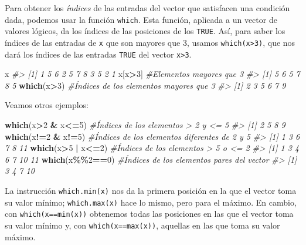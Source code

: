 \documentclass[
]{book}
\newenvironment{Shaded}{\begin{snugshade}}{\end{snugshade}}
\newcommand{\CommentTok}[1]{\textcolor[rgb]{0.56,0.35,0.01}{\textit{#1}}}
\newcommand{\DecValTok}[1]{\textcolor[rgb]{0.00,0.00,0.81}{#1}}
\newcommand{\KeywordTok}[1]{\textcolor[rgb]{0.13,0.29,0.53}{\textbf{#1}}}
\newcommand{\NormalTok}[1]{#1}
\newcommand{\OperatorTok}[1]{\textcolor[rgb]{0.81,0.36,0.00}{\textbf{#1}}}
\newcommand{\StringTok}[1]{\textcolor[rgb]{0.31,0.60,0.02}{#1}}
\theoremstyle{definition}
\theoremstyle{definition}
\theoremstyle{definition}
\theoremstyle{remark}
\begin{document}
Para obtener los \emph{índices} de las entradas del vector que satisfacen una condición dada, podemos usar la función \texttt{which}. Esta función, aplicada a un vector de valores lógicos, da los índices de las posiciones de los \texttt{TRUE}. Así, para saber los índices de las entradas de \texttt{x} que son mayores que 3, usamos \texttt{which(x\textgreater{}3)}, que nos dará los índices de las entradas \texttt{TRUE} del vector \texttt{x\textgreater{}3}.

\begin{Shaded}
\begin{Highlighting}[]
\NormalTok{x}
\CommentTok{\#\textgreater{}  [1] 1 5 6 2 5 7 8 3 5 2 1}
\NormalTok{x[x}\OperatorTok{\textgreater{}}\DecValTok{3}\NormalTok{] }\CommentTok{\#Elementos mayores que 3}
\CommentTok{\#\textgreater{} [1] 5 6 5 7 8 5}
\KeywordTok{which}\NormalTok{(x}\OperatorTok{\textgreater{}}\DecValTok{3}\NormalTok{) }\CommentTok{\#Índices de los elementos mayores que 3}
\CommentTok{\#\textgreater{} [1] 2 3 5 6 7 9}
\end{Highlighting}
\end{Shaded}

Veamos otros ejemplos:

\begin{Shaded}
\begin{Highlighting}[]
\KeywordTok{which}\NormalTok{(x}\OperatorTok{\textgreater{}}\DecValTok{2} \OperatorTok{\&}\StringTok{ }\NormalTok{x}\OperatorTok{\textless{}=}\DecValTok{5}\NormalTok{) }\CommentTok{\#Índices de los elementos \textgreater{} 2 y \textless{}= 5}
\CommentTok{\#\textgreater{} [1] 2 5 8 9}
\KeywordTok{which}\NormalTok{(x}\OperatorTok{!=}\DecValTok{2} \OperatorTok{\&}\StringTok{ }\NormalTok{x}\OperatorTok{!=}\DecValTok{5}\NormalTok{) }\CommentTok{\#Índices de los elementos diferentes de 2 y 5}
\CommentTok{\#\textgreater{} [1]  1  3  6  7  8 11}
\KeywordTok{which}\NormalTok{(x}\OperatorTok{\textgreater{}}\DecValTok{5} \OperatorTok{|}\StringTok{ }\NormalTok{x}\OperatorTok{\textless{}=}\DecValTok{2}\NormalTok{) }\CommentTok{\#Índices de los elementos \textgreater{} 5 o \textless{}= 2}
\CommentTok{\#\textgreater{} [1]  1  3  4  6  7 10 11}
\KeywordTok{which}\NormalTok{(x}\OperatorTok{\%\%}\DecValTok{2}\OperatorTok{==}\DecValTok{0}\NormalTok{) }\CommentTok{\#Índices de los elementos pares del vector}
\CommentTok{\#\textgreater{} [1]  3  4  7 10}
\end{Highlighting}
\end{Shaded}

La instrucción \texttt{which.min(x)} nos da la primera posición en la que el vector toma su valor mínimo; \texttt{which.max(x)} hace lo mismo, pero para el máximo. En cambio, con
\texttt{which(x==min(x))} obtenemos todas las posiciones en las que el vector toma su valor mínimo y, con \texttt{which(x==max(x))}, aquellas en las que toma su valor máximo.
\end{document}
